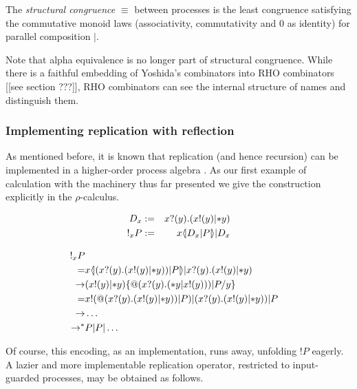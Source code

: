 \documentclass{llncs}
\makeatletter
\newcommand{\lliftb}{\langle\!|}
\newcommand{\rliftb}{|\!\rangle}
\newcommand{\pzero}{\mathbin{0}}
\newcommand{\binpar}[2]{#1 | #2}
\newcommand{\outputp}[2]{#1!(#2)}
\newcommand{\prefix}[3]{#1?(#2) . #3}
\newcommand{\lift}[2]{#1 \lliftb #2 \rliftb}
\newcommand{\quotep}[1]{\mathsf{@}#1}
\newcommand{\dropn}[1]{\mathsf{*}#1}
\newcommand{\bangp}[1]{! #1}
\newcommand{\substn}[2]{\{ #1 / #2 \}}
\newcommand{\red}{\rightarrow}
\newcommand{\rhoc}{$\rho$-calculus}
\makeatother
\begin{document}
\begin{definition}
  The {\em structural congruence} $\equiv$
  between processes \cite{SangiorgiWalker} is the least congruence
  satisfying the commutative monoid laws
  (associativity, commutativity and $\pzero$ as identity) for parallel
  composition $|$.
\end{definition}

Note that alpha equivalence is no longer part of structural congruence.  While there is a faithful embedding of Yoshida's combinators into RHO combinators [[see section ???]], RHO combinators can see the internal structure of names and distinguish them.

\subsubsection{Implementing replication with reflection}

As mentioned before, it is known that replication (and hence
recursion) can be implemented in a higher-order process algebra
\cite{SangiorgiWalker}. As our first example of calculation with the
machinery thus far presented we give the construction explicitly in
the {\rhoc}.

\begin{eqnarray}
  D_{x} & := & \prefix{x}{y}{(\binpar{\outputp{x}{y}}{\dropn{y}})} \nonumber\\
  \bangp_{x}{P} & := & \binpar{\lift{x}{\binpar{D_{x}}{P}}}{D_{x}} \nonumber
\end{eqnarray}

\begin{eqnarray}
  \bangp_{x}{P} & & \nonumber\\
  =
  & \lift{x}{(\prefix{x}{y}{(\outputp{x}{y} | \dropn{y})) | P}} 
        | \prefix{x}{y}{(\outputp{x}{y} | \dropn{y})} & \nonumber\\
  \red
  & (\outputp{x}{y} | \dropn{y})\substn{\quotep{(\prefix{x}{y}{(\dropn{y} | \outputp{x}{y})) | P}}}{y} & \nonumber\\
  =
  & \outputp{x}{\quotep{(\prefix{x}{y}{(\outputp{x}{y} | \dropn{y})) | P}}}
    | {(\prefix{x}{y}{(\outputp{x}{y} | \dropn{y})) | P}} & \nonumber\\
  \red
  & \ldots & \nonumber\\
  \red^*
  & P | P | \ldots & \nonumber
\end{eqnarray}

Of course, this encoding, as an implementation, runs away, unfolding
$\bangp{P}$ eagerly. A lazier and more implementable replication
operator, restricted to input-guarded processes, may be obtained as follows.
\end{document}
